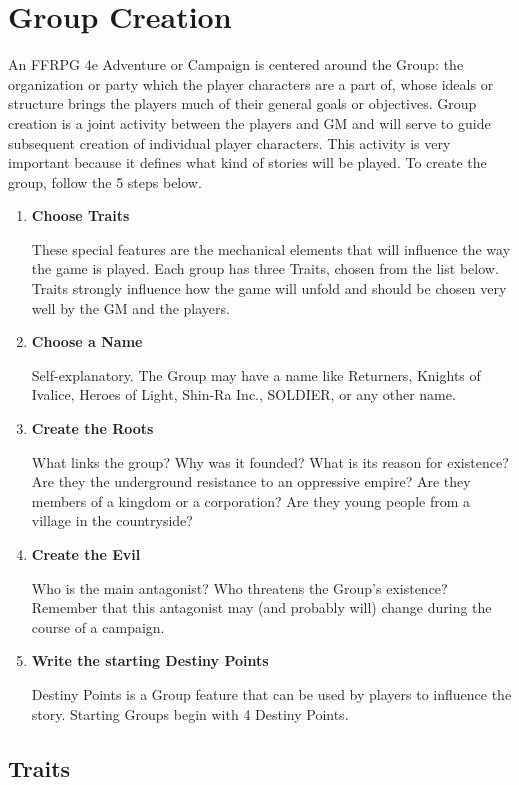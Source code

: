 \section{Group Creation}
\begin{multicols}{2}
An FFRPG 4e Adventure or Campaign is
centered around the Group: the organization or
party which the player characters are a part of,
whose ideals or structure brings the players much
of their general goals or objectives. Group creation
is a joint activity between the players and GM and
will serve to guide subsequent creation of
individual player characters. This activity is very
important because it defines what kind of stories
will be played. To create the group, follow the 5
steps below.
\begin{enumerate}

\item \textbf{Choose Traits}

These special features are the mechanical
elements that will influence the way the game is
played. Each group has three Traits, chosen from
the list below. Traits strongly influence how the
game will unfold and should be chosen very well
by the GM and the players.

\item \textbf{Choose a Name}

Self-explanatory. The Group may have a name like
Returners, Knights of Ivalice, Heroes of Light, Shin-Ra
Inc., SOLDIER, or any other name.

\item \textbf{Create the Roots}

What links the group? Why was it founded? What
is its reason for existence? Are they the
underground resistance to an oppressive empire?
Are they members of a kingdom or a corporation?
Are they young people from a village in the
countryside?

\item \textbf{Create the Evil}

Who is the main antagonist? Who threatens the
Group’s existence? Remember that this antagonist
may (and probably will) change during the course
of a campaign.

\item \textbf{Write the starting Destiny Points}

Destiny Points is a Group feature that can be used
by players to influence the story. Starting Groups
begin with 4 Destiny Points.
\end{enumerate}
\subsection{Traits}

\end{multicols}
